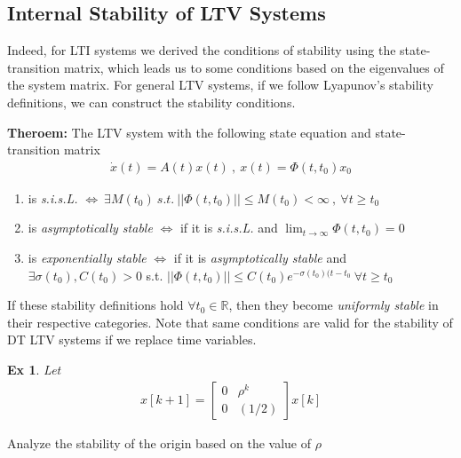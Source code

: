 \documentclass[twoside]{article}
\newtheorem{exmp}[theorem]{Ex}
\begin{document}
\subsection{Internal Stability of LTV Systems}

Indeed, for LTI systems we derived the conditions of stability using the state-transition matrix, 
which leads us to some conditions based on the eigenvalues of the system matrix. For general LTV systems,
if we follow Lyapunov's stability definitions, we can construct the stability conditions.

\textbf{Theroem:} The LTV system with the following state equation and state-transition matrix
%
\begin{align*}
 \dot{x}(t) = A(t) x(t) \ , \ x(t) = \Phi(t,t_0) x_0
\end{align*}
%
\begin{enumerate}
\item is \textit{s.i.s.L.} $\iff \ \exists M(t_0) \ s.t. \ || \Phi(t,t_0) || \leq M(t_0) < \infty \ , \ \forall t \geq t_0$
\item is \textit{asymptotically stable} $\iff$ if it is \textit{s.i.s.L.} and $ \lim_{t \to \infty} \Phi(t,t_0) = 0$
\item is \textit{exponentially stable} $\iff$ if it is \textit{asymptotically stable} and 
$ \exists \sigma(t_0) , C(t_0) > 0 $ s.t. $ || \Phi(t,t_0) || \leq C(t_0) e^{-\sigma(t_0) (t - t_0} \ \forall t \geq t_0$
\end{enumerate}
% 
If these stability definitions hold $\forall t_0 \in \mathbb{R}$, then they become \textit{uniformly stable} in their respective 
categories. Note that same conditions are valid for the stability of DT LTV systems if we replace time variables. 

\begin{exmp}
 Let 
 \begin{align*}
  x[k+1] = \begin{bmatrix} 0 & \rho^k  \\ 0 & (1/2) \end{bmatrix} x[k]
 \end{align*}
\end{exmp}
Analyze the stability of the origin based on the value of $\rho$
\end{document}
